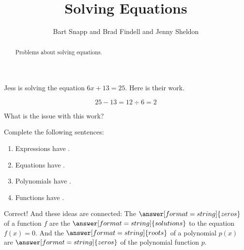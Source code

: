 \documentclass[nooutcomes]{ximera}
\title{Solving Equations}
\author{Bart Snapp and Brad Findell and Jenny Sheldon}
\begin{document}
\begin{abstract}
Problems about solving equations.
\end{abstract}
\maketitle




\begin{problem}
Jess is solving the equation $6x+13 = 25$.  Here is their work.

\[
25 - 13 = 12 \div 6 = 2
\]
\end{problem}

What is the issue with this work?
\begin{multipleChoice}
\end{multipleChoice}



\begin{problem}
Complete the following sentences: 
\begin{enumerate}
\item Expressions have . 
\item Equations have .
\item Polynomials have .
\item Functions have .
\end{enumerate}

\begin{problem}
Correct!  And these ideas are connected:  The $\answer[format=string]{zeros}$ of a function $f$ are 
the $\answer[format=string]{solutions}$ to the equation $f(x)=0$.  
And the $\answer[format=string]{roots}$ of a polynomial $p(x)$ are $\answer[format=string]{zeros}$ of the polynomial function $p$.   
\end{problem}
\end{problem}
\end{document}
